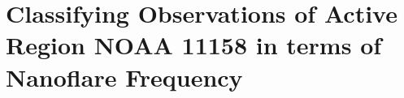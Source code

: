 \chapter{Classifying Observations of Active Region NOAA 11158 in terms of Nanoflare Frequency}\label{ch:classifying_observables}